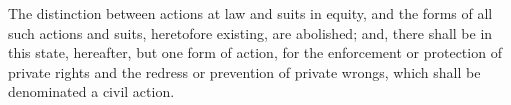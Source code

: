 The distinction between actions at law and suits in equity, and the forms of all such actions and suits, heretofore existing, are abolished; and, there shall be in this state, hereafter, but one form of action, for the enforcement or protection of private rights and the redress or prevention of private wrongs, which shall be denominated a civil action.
